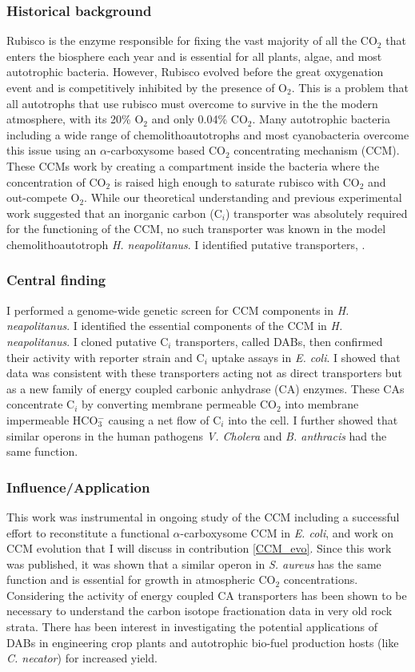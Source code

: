 \documentclass{article}
\begin{document}
\subsubsection{Historical background}
Rubisco is the enzyme responsible for fixing the vast majority of all the CO$_2$ that enters the biosphere each year and is essential for all plants, algae, and most autotrophic bacteria. 
However, Rubisco evolved before the great oxygenation event and is competitively inhibited by the presence of O$_2$.
This is a problem that all autotrophs that use rubisco must overcome to survive in the the modern atmosphere, with its 20\% O$_2$ and only 0.04\% CO$_2$.
Many autotrophic bacteria including a wide range of chemolithoautotrophs and most cyanobacteria overcome this issue using an $\alpha$-carboxysome based CO$_2$ concentrating mechanism (CCM).
These CCMs work by creating a compartment inside the bacteria where the concentration of CO$_2$ is raised high enough to saturate rubisco with CO$_2$ and out-compete O$_2$.
While our theoretical understanding and previous experimental work suggested that an inorganic carbon (C$_i$) transporter was absolutely required for the functioning of the CCM, no such transporter was known in the model chemolithoautotroph \textit{H. neapolitanus}.
I identified putative transporters, .
%
\subsubsection{Central finding}
I performed a genome-wide genetic screen for CCM components in \textit{H. neapolitanus}. 
I identified the essential components of the CCM in \textit{H. neapolitanus}.
I cloned putative C$_i$ transporters, called DABs, then confirmed their activity with reporter strain and C$_i$ uptake assays in \textit{E. coli}. 
I showed that data was consistent with these transporters acting not as direct transporters but as a new family of energy coupled carbonic anhydrase (CA) enzymes.
These CAs concentrate C$_i$ by converting membrane permeable CO$_2$ into membrane impermeable HCO$_{3}^{-}$ causing a net flow of C$_i$ into the cell.
I further showed that similar operons in the human pathogens \textit{V. Cholera} and \textit{B. anthracis} had the same function.
%
\subsubsection{Influence/Application}
This work was instrumental in ongoing study of the CCM including a successful effort to reconstitute a functional $\alpha$-carboxysome CCM in \textit{E. coli}, and work on CCM evolution that I will discuss in contribution \ref{CCM_evo}. 
Since this work was published, it was shown that a similar operon in \textit{S. aureus} has the same function and is essential for growth in atmospheric CO$_2$ concentrations. 
Considering the activity of energy coupled CA transporters has been shown to be necessary to understand the carbon isotope fractionation data in very old rock strata.
There has been interest in investigating the potential applications of DABs in engineering crop plants and autotrophic bio-fuel production hosts (like \textit{C. necator}) for increased yield.
%
\end{document}

